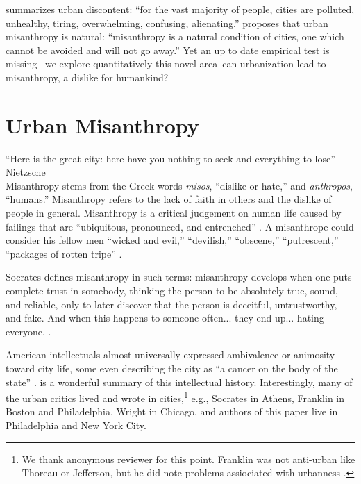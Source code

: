 \documentclass[10pt, letterpaper]{article}
\begin{document}
\begin{spacing}{1.4}
 
 \citet[][p.1009]{amin06} summarizes urban discontent:
  ``for the vast majority of people, cities are polluted,
  unhealthy, tiring, overwhelming, confusing, alienating.''
  \citet[][p.140]{thrift05} proposes that urban misanthropy is natural: ``misanthropy
 is a natural condition of cities, one which cannot be avoided and will not go away.''
%
Yet an up to date empirical test is missing--%
we explore quantitatively this novel area--can urbanization lead to misanthropy, a dislike for humankind?
 

  
\section*{Urban Misanthropy}

``Here is the great city: here have you nothing to seek and everything to lose''--Nietzsche\\

Misanthropy stems from the Greek words \textit{misos}, ``dislike or hate,'' and
\textit{anthropos}, ``humans.''  Misanthropy refers to the lack of faith in others and the dislike of people in general.
%
Misanthropy is a critical judgement on human life  caused by failings that are ``ubiquitous, pronounced, and entrenched'' \citep[p. 7]{cooper2018animals}. A misanthrope could consider his fellow men ``wicked and evil,'' ``devilish,'' ``obscene,'' ``putrescent,'' ``packages of rotten tripe'' \citep[p. 7]{cooper2018animals}.

Socrates defines misanthropy in such terms: misanthropy develops when one puts complete trust in somebody, thinking the person to be absolutely true, sound, and reliable, only to later discover that the person is deceitful, untrustworthy, and fake. And when this happens to someone often... they end up... hating everyone. \citep[cited in][]{melgar13}.

 American intellectuals almost
 universally expressed ambivalence or animosity toward city life, some even
 describing the city as ``a cancer on the body of the state''
 \citep[][p. 235]{white77}. \citet{white77} is a wonderful summary of this
 intellectual history. Interestingly, many of the urban critics lived and wrote
 in cities,\footnote{We thank anonymous reviewer for this point.
{%
   Franklin was not
   anti-urban like Thoreau or Jefferson, but he did note problems assiociated
   with urbanness \citep[e.g., p32]{white77}.} %
 } e.g., Socrates in Athens, Franklin in Boston and Philadelphia,
 Wright in Chicago, and authors of this paper live in Philadelphia and New York City.


\end{spacing}
\end{document}
